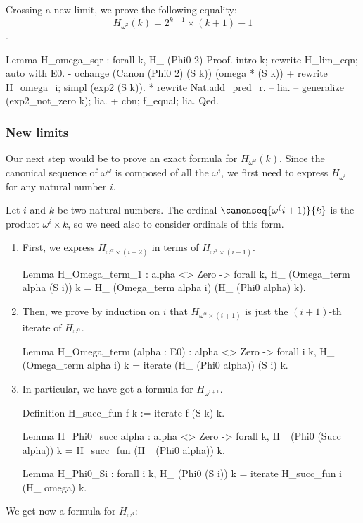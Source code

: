 Crossing a new limit, we prove the following equality: 
$$H_{\omega^2} (k) = 2 ^ {k+1} \times (k+1) - 1$$.

\begin{Coqsrc}

Lemma H_omega_sqr : forall k,
    H_ (Phi0  2)%
Proof.
  intro k; 
   rewrite H_lim_eqn; auto with E0.
  - ochange (Canon (Phi0 2) (S k)) (omega * (S k))%
    +  rewrite H_omega_i; simpl (exp2 (S k)).
       *  rewrite Nat.add_pred_r.
          -- lia. 
          --   generalize (exp2_not_zero k);  lia.
    + cbn; f_equal; lia.
Qed.
\end{Coqsrc}

\subsubsection{New limits}

Our next step would be to prove an exact formula for $H_{\omega^\omega}(k)$.
Since the canonical sequence of $\omega^\omega$ is composed of all the
$\omega^i$, we first need to express $H_{\omega^i}$ for any natural number $i$.

Let $i$ and $k$ be two natural numbers. 
The ordinal $\canonseq{\omega^(i+1)}{k}$ is the product
$\omega^i \times k$, so we need also to consider ordinals of this form.

\begin{enumerate}
\item First,  we express $H_{\omega^\alpha \times (i+2)}$ in terms of
$H_{\omega^\alpha \times (i+1)}$.

\begin{Coqsrc}
Lemma H_Omega_term_1 : alpha <> Zero -> forall  k,  
    H_ (Omega_term alpha (S i)) k =
    H_ (Omega_term alpha i) (H_ (Phi0 alpha) k).
\end{Coqsrc}

\item
Then, we prove by induction on $i$ that $H_{\omega^\alpha \times (i+1)}$ is just the
$(i+1)$-th iterate of $H_{\omega^\alpha}$.


\begin{Coqsrc}
Lemma H_Omega_term (alpha : E0)  :
alpha <> Zero -> forall i k, 
  H_ (Omega_term alpha i) k = iterate  (H_ (Phi0 alpha)) (S i) k.
\end{Coqsrc}

\item In particular, we have got a formula for $H_{\omega^{i+1}}$.

\begin{Coqsrc}
Definition H_succ_fun f k := iterate f (S k) k.

Lemma H_Phi0_succ alpha  : alpha <> Zero -> forall k,
      H_ (Phi0 (Succ alpha)) k = H_succ_fun (H_ (Phi0 alpha)) k. 

Lemma H_Phi0_Si : forall i k,
      H_ (Phi0 (S i)) k = iterate H_succ_fun i (H_ omega) k. 
\end{Coqsrc}

\end{enumerate}
We get now a  formula for $H_{\omega^3}$:

